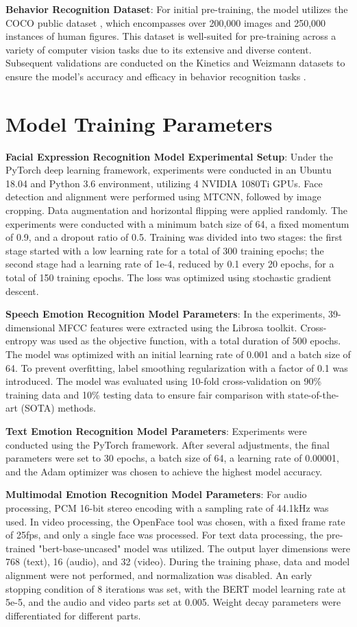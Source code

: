 \documentclass[preprint,12pt]{elsarticle}
\begin{document}
\textbf{Behavior Recognition Dataset}: For initial pre-training, the model utilizes the COCO public dataset  \cite{ref55}, which encompasses over 200,000 images and 250,000 instances of human figures. This dataset is well-suited for pre-training across a variety of computer vision tasks due to its extensive and diverse content. Subsequent validations are conducted on the Kinetics and Weizmann datasets to ensure the model's accuracy and efficacy in behavior recognition tasks  \cite{ref76}.


\section{Model Training Parameters}

\textbf{Facial Expression Recognition Model Experimental Setup}: Under the PyTorch deep learning framework, experiments were conducted in an Ubuntu 18.04 and Python 3.6 environment, utilizing 4 NVIDIA 1080Ti GPUs. Face detection and alignment were performed using MTCNN, followed by image cropping. Data augmentation and horizontal flipping were applied randomly. The experiments were conducted with a minimum batch size of 64, a fixed momentum of 0.9, and a dropout ratio of 0.5. Training was divided into two stages: the first stage started with a low learning rate for a total of 300 training epochs; the second stage had a learning rate of 1e-4, reduced by 0.1 every 20 epochs, for a total of 150 training epochs. The loss was optimized using stochastic gradient descent.

\textbf{Speech Emotion Recognition Model Parameters}: In the experiments, 39-dimensional MFCC features were extracted using the Librosa toolkit. Cross-entropy was used as the objective function, with a total duration of 500 epochs. The model was optimized with an initial learning rate of 0.001 and a batch size of 64. To prevent overfitting, label smoothing regularization with a factor of 0.1 was introduced. The model was evaluated using 10-fold cross-validation on 90\% training data and 10\% testing data to ensure fair comparison with state-of-the-art (SOTA) methods.

\textbf{Text Emotion Recognition Model Parameters}: Experiments were conducted using the PyTorch framework. After several adjustments, the final parameters were set to 30 epochs, a batch size of 64, a learning rate of 0.00001, and the Adam optimizer was chosen to achieve the highest model accuracy.

\textbf{Multimodal Emotion Recognition Model Parameters}: For audio processing, PCM 16-bit stereo encoding with a sampling rate of 44.1kHz was used. In video processing, the OpenFace tool was chosen, with a fixed frame rate of 25fps, and only a single face was processed. For text data processing, the pre-trained "bert-base-uncased" model was utilized. The output layer dimensions were 768 (text), 16 (audio), and 32 (video). During the training phase, data and model alignment were not performed, and normalization was disabled. An early stopping condition of 8 iterations was set, with the BERT model learning rate at 5e-5, and the audio and video parts set at 0.005. Weight decay parameters were differentiated for different parts.
\end{document}
